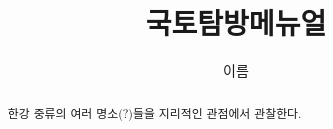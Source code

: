 \documentclass[chapter, oneside]{oblivoir}
\title{국토탐방메뉴얼}
\author{이름}
\begin{document}
    \maketitle
    \begin{abstract}
    한강 중류의 여러 명소(?)들을 지리적인 관점에서 관찰한다.
    \end{abstract}
    \newpage
    \tableofcontents
    
    
    
    
\end{document}

